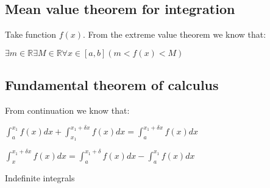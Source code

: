 
\subsection{Mean value theorem for integration}

Take function \(f(x)\). From the extreme value theorem we know that:

\(\exists m \in \mathbb{R} \exists M\in \mathbb{R}\forall x\in [a,b](m<f(x)<M)\)

\subsection{Fundamental theorem of calculus}

From continuation we know that:

\(\int_a^{x_1}f(x)dx+\int_{x_1}^{x_1+\delta x}f(x)dx=\int_a^{x_1+\delta x}f(x)dx\)

\(\int_x^{x_1+\delta x}f(x)dx=\int_a^{x_1+\delta }f(x)dx-\int_a^{x_1 }f(x)dx\)

Indefinite integrals

